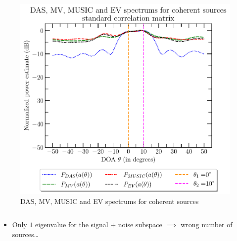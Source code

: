 \documentclass[UKenglish,8pt,aspectratio=1610]{beamer}
\begin{document}
\begin{frame}
\begin{columns}
\begin{column}{0.5\textwidth}
\begin{figure}[h!]
			\includegraphics[scale=0.45]{question8/spectrums/part_A_question_8_all_spectrums_standard_correlation_matrix.pdf}
			\caption{DAS, MV, MUSIC and EV spectrums for coherent sources}
		\end{figure}
	\end{column}
\end{columns}
\begin{itemize}
	\item Only $1$ eigenvalue for the signal + noise subspace $\implies$ wrong number of sources\dots
\end{itemize}
\end{frame}
\end{document}
